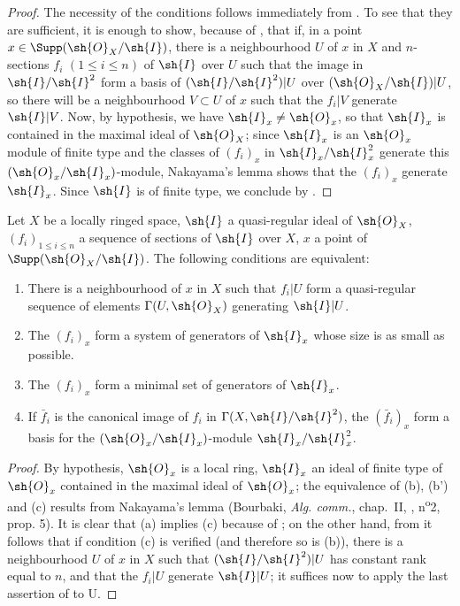 \begin{proof}
The necessity of the conditions follows immediately from .
To see that they are sufficient, it is enough to show, because of , that if, in a point $x \in \Supp(\sh{O}_X/\sh{I})$, there is a neighbourhood $U$ of $x$ in $X$ and $n$-sections $f_i$ $(1 \leq i \leq n)$ of $\sh{I}$ over $U$ such that the image in $\sh{I}/\sh{I}^2$ form a basis of $(\sh{I}/\sh{I}^2)|U$ over $(\sh{O}_X/\sh{I})|U$, so there will be a neighbourhood $V \subset U$ of $x$ such that the $f_i|V$ generate $\sh{I}|V$.
Now, by hypothesis, we have $\sh{I}_x \neq \sh{O}_x$, so that $\sh{I}_x$ is contained in the maximal ideal of $\sh{O}_X$; 
since $\sh{I}_x$ is an $\sh{O}_x$ module of finite type and the classes of $(f_i)_x$ in $\sh{I}_x/\sh{I}_x^2$ generate this $(\sh{O}_x/\sh{I}_x)$-module, Nakayama's lemma shows that the $(f_i)_x$ generate $\sh{I}_x$.
Since $\sh{I}$ is of finite type, we conclude by .
\end{proof} 

\begin{corollary}[16.9.5]
\label{IV.16.9.5}
Let $X$ be a locally ringed space, $\sh{I}$ a quasi-regular ideal of $\sh{O}_X$, $(f_i)_{1 \leq i \leq n}$ a sequence of sections of $\sh{I}$ over $X$, $x$ a point of $\Supp(\sh{O}_X/\sh{I})$. 
The following conditions are equivalent:
\begin{enumerate}
  \item[(a)] There is a neighbourhood of $x$ in $X$ such that $f_i|U$ form a quasi-regular sequence of elements $\Gamma(U, \sh{O}_X)$ generating $\sh{I}|U$.
  \item[(b)] The $(f_i)_x$ form a system of generators of $\sh{I}_x$ whose size is as small as possible.
  \item[(b')] The $(f_i)_x$ form a minimal set of generators of $\sh{I}_x$.
  \item[(c)] If $\bar f_i$ is the canonical image of $f_i$ in $\Gamma(X, \sh{I}/\sh{I}^2)$, the $(\bar f_i)_x$ form a basis for the $(\sh{O}_x/\sh{I}_x)$-module $\sh{I}_x/\sh{I}_x^2$.
\end{enumerate}
\end{corollary}

\begin{proof}
By hypothesis, $\sh{O}_x$ is a local ring, $\sh{I}_x$ an ideal of finite type of $\sh{O}_x$ contained in the maximal ideal of $\sh{O}_x$;
the equivalence of (b), (b') and (c) results from Nakayama's lemma (Bourbaki, \emph{Alg. comm.}, chap.~II, , n\textsuperscript{o}2, prop. 5).
It is clear that (a) implies (c) because of ;
on the other hand, from  it follows that if condition (c) is verified (and therefore so is (b)), there is a neighbourhood $U$ of $x$ in $X$ such that $(\sh{I}/\sh{I}^2)|U$ has constant rank equal to $n$, and that the $f_i|U$ generate $\sh{I}|U$;
it suffices now to apply the last assertion of  to U.
\end{proof}


